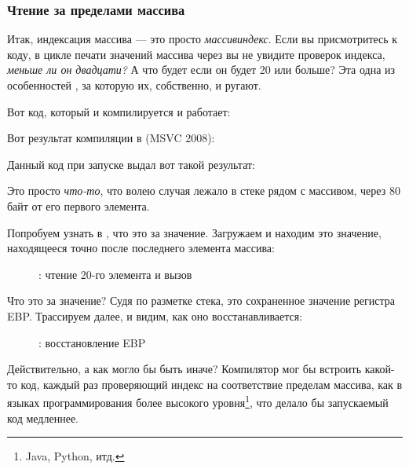 \subsubsection{Чтение за пределами массива}

Итак, индексация массива --- это просто \emph{массив\lbrack{}индекс\rbrack}.  %
Если вы присмотритесь к коду, в цикле печати значений массива через \printf вы 
не увидите проверок индекса, \emph{меньше ли он двадцати?} 
А что будет если он будет 20 или больше? 
Эта одна из особенностей \CCpp, за которую их, собственно, и ругают.

Вот код, который и компилируется и работает:



Вот результат компиляции в (MSVC 2008):



Данный код при запуске выдал вот такой результат:



Это просто \emph{что-то}, что волею случая лежало в стеке рядом с массивом, 
через 80 байт от его первого элемента.

\clearpage
\myindex{\olly}
Попробуем узнать в \olly, что это за значение.
Загружаем и находим это значение, находящееся точно после последнего элемента массива:

\begin{figure}[H]
\centering
{}
\caption{\olly: чтение 20-го элемента и вызов \printf}
\label{fig:array_BO_olly_r1}
\end{figure}

Что это за значение? 
Судя по разметке стека, это сохраненное значение регистра EBP.
\clearpage
Трассируем далее, и видим, как оно восстанавливается:

\begin{figure}[H]
\centering
{}
\caption{\olly: восстановление EBP}
\label{fig:array_BO_olly_r2}
\end{figure}

Действительно, а как могло бы быть иначе? Компилятор мог бы встроить какой-то код, 
каждый раз проверяющий индекс на соответствие пределам массива, как в языках программирования 
более высокого уровня\footnote{Java, Python, итд.}, что делало бы запускаемый код медленнее.


